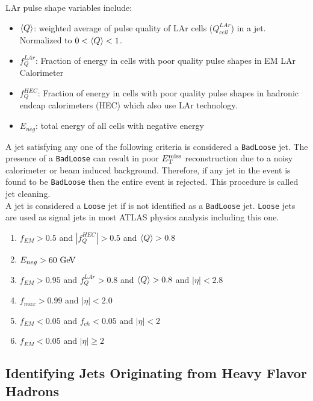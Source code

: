 \indent LAr pulse shape variables include: \\

\begin{itemize}
\item[] $\braket{Q}$: weighted average of pulse quality of LAr cells ($Q^{LAr}_{cell}$) in a jet.  Normalized to $0 < \braket{Q} < 1$.
\item[] $f^{LAr}_{Q}$: Fraction of energy in cells with poor quality pulse shapes in EM LAr Calorimeter
\item[] $f^{HEC}_{Q}$: Fraction of energy in cells with poor quality pulse shapes in hadronic endcap calorimeters (HEC) which also use LAr technology.
\item[] $E_{neg}$: total energy of all cells with negative energy
\end{itemize}

\indent A jet satisfying any one of the following criteria is considered a {\tt BadLoose} jet.  The presence of a {\tt BadLoose} can result in poor $E_{\mathrm{T}}^{\mathrm{miss}}$ reconstruction due to a noisy calorimeter or beam induced background.  Therefore, if any jet in the event is found to be {\tt BadLoose} then the entire event is rejected.   This procedure is called jet cleaning.  \\

\indent A jet is considered a {\tt Loose} jet if is not identified as a {\tt BadLoose} jet.  {\tt Loose} jets are used as signal jets in most ATLAS physics analysis including this one. \\

\begin{enumerate}
\item[] $f_{EM} > 0.5$ and $|f^{HEC}_{Q}| > 0.5$ and $\braket{Q} > 0.8$
\item[] $E_{neg} > 60 \gev$
\item[] $f_{EM} > 0.95$ and $f^{LAr}_{Q} > 0.8$ and $\braket{Q}>0.8$ and $|\eta|<2.8$
\item[] $f_{max}>0.99$ and $|\eta|<2.0$
\item[] $f_{EM}<0.05$ and $f_{ch}<0.05$ and $|\eta|<2$
\item[] $f_{EM}<0.05$ and $|\eta|\ge2$
\end{enumerate}

\subsection{Identifying Jets Originating from Heavy Flavor Hadrons}
\label{sec:jet:btagging}


